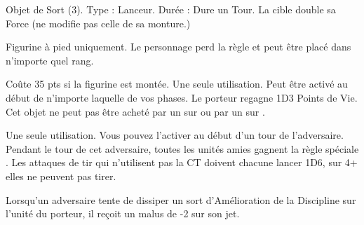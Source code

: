 \endpricelist

\armytalismans

\startpricelist

Objet de Sort (3). Type : Lanceur. Durée : Dure un Tour. La cible double sa Force (ne modifie pas celle de sa monture.)

\endpricelist

\armyenchanteditems

\startpricelist

Figurine à pied uniquement. Le personnage perd la règle \firstinrank{} et peut être placé dans n'importe quel rang.

Coûte 35 pts si la figurine est montée. Une seule utilisation. Peut être activé au début de n'importe laquelle de vos phases. Le porteur regagne 1D3 Points de Vie. Cet objet ne peut pas être acheté par un \magister{} sur \doombell{} ou par un \plaguepriest{} sur \plaguependulum{}.

\endpricelist

\armymagicalbanners

\startpricelist

Une seule utilisation. Vous pouvez l'activer au début d'un tour de l'adversaire. Pendant le tour de cet adversaire, toutes les unités amies gagnent la règle spéciale \hardtarget{}. Les attaques de tir qui n'utilisent pas la CT doivent chacune lancer 1D6, sur 4+ elles ne peuvent pas tirer.

Lorsqu'un adversaire tente de dissiper un sort d'Amélioration de la Discipline \ruin{} sur l'unité du porteur, il reçoit un malus de -2 sur son jet.

\endpricelist

\closearmymagicalitems








\quickrefsheettitle


